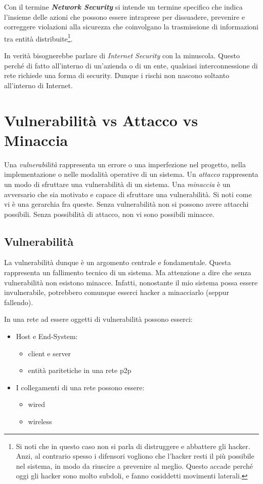 \documentclass[14pt]{extreport}
\begin{document}
Con il termine \textbf{\textit{Network Security}} si intende un termine specifico che indica l'insieme delle azioni che possono essere intraprese per dissuadere, prevenire e correggere violazioni alla sicurezza che coinvolgano la trasmissione di informazioni tra entità distribuite\footnote{Si noti che in questo caso non si parla di distruggere e abbattere gli hacker. Anzi, al contrario spesso i difensori vogliono che l'hacker resti il più possibile nel sistema, in modo da riuscire a prevenire al meglio. Questo accade perché oggi gli hacker sono molto subdoli, e fanno cosiddetti movimenti laterali.}.

In verità bisognerebbe parlare di \textit{Internet Security} con la  minuscola. Questo perché di fatto all'interno di un'azienda o di un ente, qualsiasi interconnessione di rete richiede una forma di security. Dunque i rischi non nascono soltanto all'interno di Internet.


\section{Vulnerabilità vs Attacco vs Minaccia}
Una \textit{vulnerabilità} rappresenta un errore o una imperfezione nel progetto, nella implementazione o nelle modalità operative di un sistema.\newline
Un \textit{attacco} rappresenta un modo di sfruttare una vulnerabilità di un sistema.\newline
Una \textit{minaccia} è un avversario che sia motivato e capace di sfruttare una vulnerabilità.
Si noti come vi è una gerarchia fra queste. Senza vulnerabilità non si possono avere attacchi possibili. Senza possibilità di attacco, non vi sono possibili minacce.

\subsection{Vulnerabilità}
La vulnerabilità dunque è un argomento centrale e fondamentale. Questa rappresenta un fallimento tecnico di un sistema. Ma attenzione a dire che senza vulnerabilità non esistono minacce. Infatti, nonostante il mio sistema possa essere invulnerabile, potrebbero comunque esserci hacker a minacciarlo (seppur fallendo).

In una rete ad essere oggetti di vulnerabilità possono esserci:

\begin{itemize}
    \item Host e End-System:
    \begin{itemize}
        \item client e server
        \item entità paritetiche in una rete p2p
    \end{itemize}
    \item I collegamenti di una rete possono essere:
    \begin{itemize}
        \item wired
        \item wireless
    \end{itemize}
\end{itemize}
\end{document}
